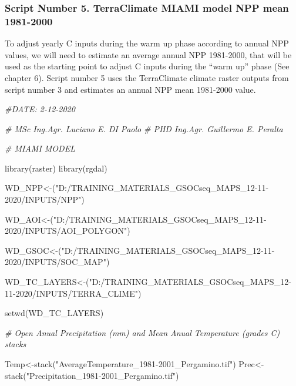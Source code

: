 \documentclass[
  10pt,
  b5paper,
]{book}
\newenvironment{Shaded}{\begin{snugshade}}{\end{snugshade}}
\newcommand{\CommentTok}[1]{\textcolor[rgb]{0.56,0.35,0.01}{\textit{#1}}}
\newcommand{\FunctionTok}[1]{\textcolor[rgb]{0.00,0.00,0.00}{#1}}
\newcommand{\NormalTok}[1]{#1}
\newcommand{\OtherTok}[1]{\textcolor[rgb]{0.56,0.35,0.01}{#1}}
\newcommand{\StringTok}[1]{\textcolor[rgb]{0.31,0.60,0.02}{#1}}
\begin{document}
\hypertarget{script-number-5.-terraclimate-miami-model-npp-mean-1981-2000}{%
\subsubsection{Script Number 5. TerraClimate MIAMI model NPP mean 1981-2000}\label{script-number-5.-terraclimate-miami-model-npp-mean-1981-2000}}

To adjust yearly C inputs during the warm up phase according to annual NPP values, we will need to estimate an average annual NPP 1981-2000, that will be used as the starting point to adjust C inputs during the ``warm up'' phase (See chapter 6). Script number 5 uses the TerraClimate climate raster outputs from script number 3 and estimates an annual NPP mean 1981-2000 value.

\begin{Shaded}
\begin{Highlighting}[]
\CommentTok{\#DATE: 2{-}12{-}2020}

\CommentTok{\# MSc Ing.Agr. Luciano E. DI Paolo}
\CommentTok{\# PHD Ing.Agr. Guillermo E. Peralta}


\CommentTok{\# MIAMI MODEL}

\FunctionTok{library}\NormalTok{(raster)}
\FunctionTok{library}\NormalTok{(rgdal)}

\NormalTok{WD\_NPP}\OtherTok{\textless{}{-}}\NormalTok{(}\StringTok{"D:/TRAINING\_MATERIALS\_GSOCseq\_MAPS\_12{-}11{-}2020/INPUTS/NPP"}\NormalTok{)}

\NormalTok{WD\_AOI}\OtherTok{\textless{}{-}}\NormalTok{(}\StringTok{"D:/TRAINING\_MATERIALS\_GSOCseq\_MAPS\_12{-}11{-}2020/INPUTS/AOI\_POLYGON"}\NormalTok{)}

\NormalTok{WD\_GSOC}\OtherTok{\textless{}{-}}\NormalTok{(}\StringTok{"D:/TRAINING\_MATERIALS\_GSOCseq\_MAPS\_12{-}11{-}2020/INPUTS/SOC\_MAP"}\NormalTok{)}

\NormalTok{WD\_TC\_LAYERS}\OtherTok{\textless{}{-}}\NormalTok{(}\StringTok{"D:/TRAINING\_MATERIALS\_GSOCseq\_MAPS\_12{-}11{-}2020/INPUTS/TERRA\_CLIME"}\NormalTok{)}

\FunctionTok{setwd}\NormalTok{(WD\_TC\_LAYERS)}

\CommentTok{\# Open Anual Precipitation (mm) and Mean Anual Temperature (grades C) stacks}

\NormalTok{Temp}\OtherTok{\textless{}{-}}\FunctionTok{stack}\NormalTok{(}\StringTok{"AverageTemperature\_1981{-}2001\_Pergamino.tif"}\NormalTok{)}
\NormalTok{Prec}\OtherTok{\textless{}{-}}\FunctionTok{stack}\NormalTok{(}\StringTok{"Precipitation\_1981{-}2001\_Pergamino.tif"}\NormalTok{)}


\end{Highlighting}
\end{Shaded}
\end{document}
